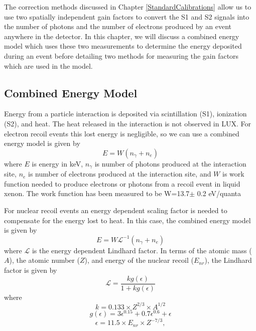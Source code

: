 \documentclass[a4paper,12pt]{article}
\begin{document}
{The correction methods discussed in Chapter \ref{StandardCalibrations} allow us to use two spatially independent gain factors to convert the S1 and S2 signals into the number of photons and the number of electrons produced by an event anywhere in the detector. In this chapter, we will discuss a combined energy model which uses these two measurements to determine the energy deposited during an event before detailing two methods for measuring the gain factors which are used in the model.  


\subsection{Combined Energy Model}

Energy from a particle interaction is deposited via scintillation (S1), ionization (S2), and heat. The heat released in the interaction is not observed in LUX. For electron recoil events this lost energy is negligible, so we can use a combined energy model is given by
\begin{equation} \label{EnergyOne}
 E=W (n_\gamma + n_e)
\end{equation}
where $E$ is energy in keV, $n_\gamma$ is number of photons produced at the interaction site, $n_e$ is number of electrons produced at the interaction site, and $W$ is work function needed to produce electrons or photons from a recoil event in liquid xenon.  The work function has been measured to be  W=13.7$\pm$ 0.2 eV/quanta \cite{Dahl} 

For nuclear recoil events an energy dependent scaling factor is needed to compensate for the energy lost to heat. \cite{Lewin} In this case, the combined energy model is given by
\begin{equation} \label{EnergyTwo}
 E=W \mathcal{L}^{-1} (n_\gamma + n_e)
\end{equation}
where $\mathcal{L}$ is the energy dependent Lindhard factor.  In terms of the atomic mass ($A$), the atomic number ($Z$), and energy of the nuclear recoil ($E_{nr}$), the Lindhard factor is given by 
\begin{equation}
\mathcal{L}=\frac{kg(\epsilon)}{1 + kg(\epsilon)}
\end{equation}
where
\begin{equation}
k=0.133 \times Z^{2/3} \times A^{1/2}
\end{equation}
\begin{equation}
g(\epsilon)=3\epsilon^{0.15} + 0.7\epsilon^{0.6} +\epsilon
\end{equation}
\begin{equation}
\epsilon = 11.5 \times E_{nr} \times Z^{-7/3},
\end{equation}

}
\end{document}
